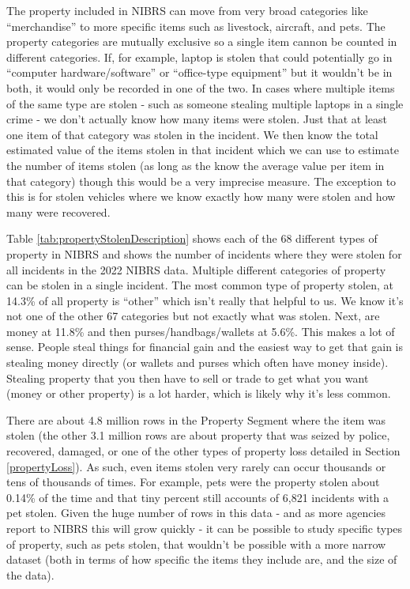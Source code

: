 \documentclass[
]{krantz}
\begin{document}
The property included in NIBRS can move from very broad
categories like ``merchandise'' to more specific items such
as livestock, aircraft, and pets. The property categories
are mutually exclusive so a single item cannon be counted in
different categories. If, for example, laptop is stolen that
could potentially go in ``computer hardware/software'' or
``office-type equipment'' but it wouldn't be in both, it
would only be recorded in one of the two. In cases where
multiple items of the same type are stolen - such as someone
stealing multiple laptops in a single crime - we don't
actually know how many items were stolen. Just that at least
one item of that category was stolen in the incident. We
then know the total estimated value of the items stolen in
that incident which we can use to estimate the number of
items stolen (as long as the know the average value per item
in that category) though this would be a very imprecise
measure. The exception to this is for stolen vehicles where
we know exactly how many were stolen and how many were
recovered.

Table \ref{tab:propertyStolenDescription} shows each of the
68 different types of property in NIBRS and shows the number
of incidents where they were stolen for all incidents in the
2022 NIBRS data. Multiple different categories of property
can be stolen in a single incident. The most common type of
property stolen, at 14.3\% of all property is ``other''
which isn't really that helpful to us. We know it's not one
of the other 67 categories but not exactly what was stolen.
Next, are money at 11.8\% and then purses/handbags/wallets
at 5.6\%. This makes a lot of sense. People steal things for
financial gain and the easiest way to get that gain is
stealing money directly (or wallets and purses which often
have money inside). Stealing property that you then have to
sell or trade to get what you want (money or other property)
is a lot harder, which is likely why it's less common.

There are about 4.8 million rows in the Property Segment
where the item was stolen (the other 3.1 million rows are
about property that was seized by police, recovered,
damaged, or one of the other types of property loss detailed
in Section \ref{propertyLoss}). As such, even items stolen
very rarely can occur thousands or tens of thousands of
times. For example, pets were the property stolen about
0.14\% of the time and that tiny percent still accounts of
6,821 incidents with a pet stolen. Given the huge number of
rows in this data - and as more agencies report to NIBRS
this will grow quickly - it can be possible to study
specific types of property, such as pets stolen, that
wouldn't be possible with a more narrow dataset (both in
terms of how specific the items they include are, and the
size of the data).
\end{document}
